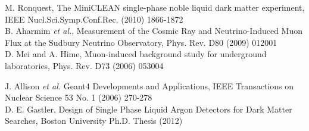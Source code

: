 \documentclass{JINST}
\begin{document}
\begin{thebibliography}{999}

M. Ronquest, The MiniCLEAN single-phase noble liquid dark matter experiment, IEEE Nucl.Sci.Symp.Conf.Rec. (2010) 1866-1872 \\

B. Aharmim {\it et al.}, Measurement of the Cosmic Ray and Neutrino-Induced Muon Flux at the Sudbury Neutrino Observatory, Phys. Rev. D80 (2009) 012001 \\

D. Mei and A. Hime, Muon-induced background study for underground laboratories, Phys. Rev. D73 (2006) 053004

J. Allison {\it et al.} Geant4 Developments and Applications, IEEE Transactions on Nuclear Science 53 No. 1 (2006) 270-278 \\

D. E. Gastler, Design of Single Phase Liquid Argon Detectors for Dark Matter Searches, Boston University Ph.D. Thesis (2012) \\


\end{thebibliography}
\end{document}
